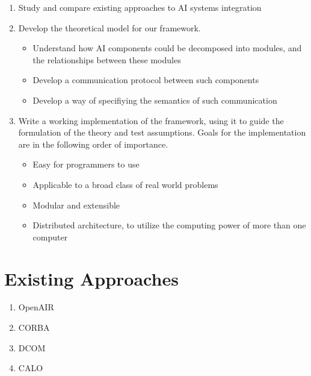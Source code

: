 \documentclass[14pt]{article} %
\begin{document}
\begin{enumerate}
	\item Study and compare existing approaches to AI systems integration
	\item Develop the theoretical model for our framework.
		\begin{itemize}
			\item Understand how AI components could be decomposed into modules, and the relationships between these modules
			\item Develop a communication protocol between such components
			\item Develop a way of specifiying the semantics of such communication
		\end{itemize}
	\item Write a working implementation of the framework, using it to guide the formulation of the theory and test assumptions. Goals for the implementation are in the following order of importance.
		\begin{itemize}
			\item Easy for programmers to use
			\item Applicable to a broad class of real world problems
			\item Modular and extensible
			\item Distributed architecture, to utilize the computing power of more than one computer
		\end{itemize}

\end{enumerate}

\section{Existing Approaches}

\begin {enumerate}
	\item OpenAIR
	\item CORBA
          \item DCOM
	\item CALO
\end{enumerate}
	
\end{document}
